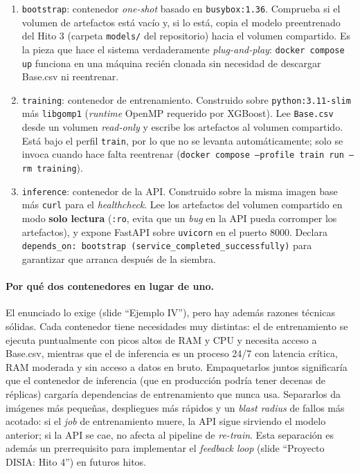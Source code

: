 \documentclass[12pt,a4paper]{report}
\begin{document}
\begin{enumerate}
    \item \texttt{bootstrap}: contenedor \textit{one-shot} basado en \texttt{busybox:1.36}. Comprueba si el volumen de artefactos está vacío y, si lo está, copia el modelo preentrenado del Hito 3 (carpeta \texttt{models/} del repositorio) hacia el volumen compartido. Es la pieza que hace el sistema verdaderamente \textit{plug-and-play}: \texttt{docker compose up} funciona en una máquina recién clonada sin necesidad de descargar Base.csv ni reentrenar.
    \item \texttt{training}: contenedor de entrenamiento. Construido sobre \texttt{python:3.11-slim} más \texttt{libgomp1} (\textit{runtime} OpenMP requerido por XGBoost). Lee \texttt{Base.csv} desde un volumen \textit{read-only} y escribe los artefactos al volumen compartido. Está bajo el perfil \texttt{train}, por lo que no se levanta automáticamente; solo se invoca cuando hace falta reentrenar (\texttt{docker compose --profile train run --rm training}).
    \item \texttt{inference}: contenedor de la API. Construido sobre la misma imagen base más \texttt{curl} para el \textit{healthcheck}. Lee los artefactos del volumen compartido en modo \textbf{solo lectura} (\texttt{:ro}, evita que un \textit{bug} en la API pueda corromper los artefactos), y expone FastAPI sobre \texttt{uvicorn} en el puerto 8000. Declara \texttt{depends\_on: bootstrap (service\_completed\_successfully)} para garantizar que arranca después de la siembra.
\end{enumerate}

\paragraph{Por qué dos contenedores en lugar de uno.} El enunciado lo exige (slide ``Ejemplo IV''), pero hay además razones técnicas sólidas. Cada contenedor tiene necesidades muy distintas: el de entrenamiento se ejecuta puntualmente con picos altos de RAM y CPU y necesita acceso a Base.csv, mientras que el de inferencia es un proceso 24/7 con latencia crítica, RAM moderada y sin acceso a datos en bruto. Empaquetarlos juntos significaría que el contenedor de inferencia (que en producción podría tener decenas de réplicas) cargaría dependencias de entrenamiento que nunca usa. Separarlos da imágenes más pequeñas, despliegues más rápidos y un \textit{blast radius} de fallos más acotado: si el \textit{job} de entrenamiento muere, la API sigue sirviendo el modelo anterior; si la API se cae, no afecta al pipeline de \textit{re-train}. Esta separación es además un prerrequisito para implementar el \textit{feedback loop} (slide ``Proyecto DISIA: Hito 4'') en futuros hitos.
\end{document}
